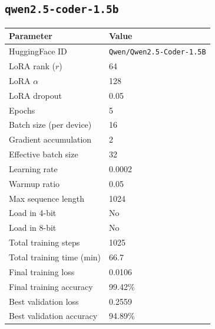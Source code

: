 \documentclass[11pt,a4paper]{article}
\begin{document}
\subsection{\texttt{qwen2.5-coder-1.5b}}

\begin{table}[H]
  \centering
  \begin{tabular}{ll}
    \toprule
    \textbf{Parameter}        & \textbf{Value}                   \\
    \midrule
    HuggingFace ID            & \texttt{Qwen/Qwen2.5-Coder-1.5B} \\
    LoRA rank ($r$)           & 64                               \\
    LoRA $\alpha$             & 128                              \\
    LoRA dropout              & 0.05                             \\
    Epochs                    & 5                                \\
    Batch size (per device)   & 16                               \\
    Gradient accumulation     & 2                                \\
    Effective batch size      & 32                               \\
    Learning rate             & 0.0002                           \\
    Warmup ratio              & 0.05                             \\
    Max sequence length       & 1024                             \\
    Load in 4-bit             & No                               \\
    Load in 8-bit             & No                               \\
    Total training steps      & 1025                             \\
    Total training time (min) & 66.7                             \\
    Final training loss       & 0.0106                           \\
    Final training accuracy   & 99.42\%                          \\
    Best validation loss      & 0.2559                           \\
    Best validation accuracy  & 94.89\%                          \\
    \bottomrule
  \end{tabular}
\end{table}
\end{document}
